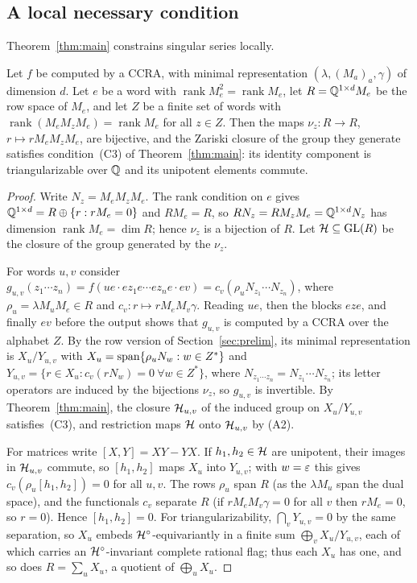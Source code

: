 \subsection{A local necessary condition}\label{ssec:local}
Theorem~\ref{thm:main} constrains singular series locally.
\begin{corollary}\label{cor:local}
Let $f$ be computed by a CCRA, with minimal representation $(\lambda,(M_a)_a,\gamma)$ of dimension $d$. Let $e$ be a word with $\operatorname{rank}M_e^2=\operatorname{rank}M_e$, let $R=\mathbb{Q}^{1\times d}M_e$ be the row space of $M_e$, and let $Z$ be a finite set of words with $\operatorname{rank}(M_eM_zM_e)=\operatorname{rank}M_e$ for all $z\in Z$. Then the maps $\nu_z:R\to R$, $r\mapsto rM_eM_zM_e$, are bijective, and the Zariski closure of the group they generate satisfies condition~(C3) of Theorem~\ref{thm:main}: its identity component is triangularizable over $\mathbb{Q}$ and its unipotent elements commute.
\end{corollary}
\begin{proof}
Write $N_z=M_eM_zM_e$. The rank condition on $e$ gives $\mathbb{Q}^{1\times d}=R\oplus\{r:rM_e=0\}$ and $RM_e=R$, so $RN_z=RM_zM_e=\mathbb{Q}^{1\times d}N_z$ has dimension $\operatorname{rank}M_e=\dim R$; hence $\nu_z$ is a bijection of $R$. Let $\mathcal{H}\subseteq\mathrm{GL}(R)$ be the closure of the group generated by the $\nu_z$.

For words $u,v$ consider $g_{u,v}(z_1\cdots z_n)=f(ue\cdot ez_1e\cdots ez_ne\cdot ev)=c_v(\rho_uN_{z_1}\cdots N_{z_n})$, where $\rho_u=\lambda M_uM_e\in R$ and $c_v:r\mapsto rM_eM_v\gamma$. Reading $ue$, then the blocks $eze$, and finally $ev$ before the output shows that $g_{u,v}$ is computed by a CCRA over the alphabet $Z$. By the row version of Section~\ref{sec:prelim}, its minimal representation is $X_u/Y_{u,v}$ with $X_u=\operatorname{span}\{\rho_uN_w:w\in Z^*\}$ and $Y_{u,v}=\{r\in X_u:c_v(rN_w)=0\ \forall w\in Z^*\}$, where $N_{z_1\cdots z_n}=N_{z_1}\cdots N_{z_n}$; its letter operators are induced by the bijections $\nu_z$, so $g_{u,v}$ is invertible. By Theorem~\ref{thm:main}, the closure $\mathcal{H}_{u,v}$ of the induced group on $X_u/Y_{u,v}$ satisfies~(C3), and restriction maps $\mathcal{H}$ onto $\mathcal{H}_{u,v}$ by (A2).

For matrices write $[X,Y]=XY-YX$. If $h_1,h_2\in\mathcal{H}$ are unipotent, their images in $\mathcal{H}_{u,v}$ commute, so $[h_1,h_2]$ maps $X_u$ into $Y_{u,v}$; with $w=\varepsilon$ this gives $c_v(\rho_u[h_1,h_2])=0$ for all $u,v$. The rows $\rho_u$ span $R$ (as the $\lambda M_u$ span the dual space), and the functionals $c_v$ separate $R$ (if $rM_eM_v\gamma=0$ for all $v$ then $rM_e=0$, so $r=0$). Hence $[h_1,h_2]=0$. For triangularizability, $\bigcap_vY_{u,v}=0$ by the same separation, so $X_u$ embeds $\mathcal{H}^\circ$-equivariantly in a finite sum $\bigoplus_vX_u/Y_{u,v}$, each of which carries an $\mathcal{H}^\circ$-invariant complete rational flag; thus each $X_u$ has one, and so does $R=\sum_uX_u$, a quotient of $\bigoplus_uX_u$.
\end{proof}
